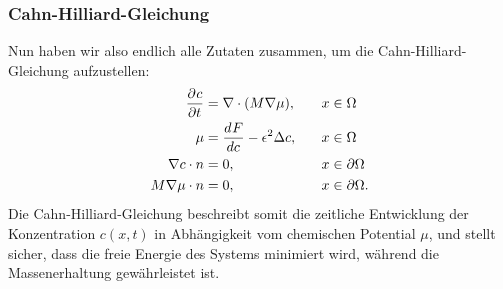 \subsubsection{Cahn-Hilliard-Gleichung}
Nun haben wir also endlich alle Zutaten zusammen,
um die Cahn-Hilliard-Gleichung aufzustellen:
\begin{align}
\begin{aligned}
\frac{\partial^{} c}{\partial t^{}}
&=
\nabla \cdot (M \nabla \mu)
,\quad&
x &\in \Omega
\\
\mu
&=
\frac{d^{}{F}}{d{c^{}}} -  \epsilon^2 \Delta c
,&
x &\in \Omega
\\
\nabla c \cdot n
&=
0
,&
x &\in \partial\Omega
\\
M \nabla \mu \cdot n
&=
0
,&
x &\in \partial\Omega
.
\end{aligned}
\label{cahnhilliard:cheq}
\end{align}
Die Cahn-Hilliard-Gleichung beschreibt somit
die zeitliche Entwicklung der Konzentration $c(x,t)$
in Abhängigkeit vom chemischen Potential $\mu$,
und stellt sicher,
dass die freie Energie des Systems minimiert wird,
während die Massenerhaltung gewährleistet ist.
